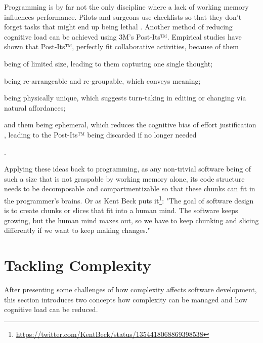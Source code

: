 Programming is by far not the only discipline where a lack of working memory influences performance.
Pilots and surgeons use checklists so that they don't forget tasks that might end up being lethal \cite{seemann_code_2021}.
Another method of reducing cognitive load can be achieved using 3M's Post-Its™.
Empirical studies \cite{digiano_learning_nodate, dove_grouping_2018} have shown that Post-Its™, perfectly fit collaborative activities, because of them
\begin{enumerate*}[label=(\roman*)]
\item being of limited size, leading to them capturing one single thought;
\item being re-arrangeable and re-groupable, which conveys meaning;
\item being physically unique, which suggests turn-taking in editing or changing via natural affordances;
\item and them being ephemeral, which reduces the cognitive bias of effort justification \cite{norton_ikea_2012}, leading to the Post-Its™ being discarded if no longer needed
\end{enumerate*}.

Applying these ideas back to programming, as any non-trivial software being of such a size that is not graspable by working memory alone, its code structure needs to be decomposable and compartmentizable so that these chunks can fit in the programmer's brains.
Or as Kent Beck puts it\footnote{\url{https://twitter.com/KentBeck/status/1354418068869398538}}: "The goal of software design is to create chunks or slices that fit into a human mind. The software keeps growing, but the human mind maxes out, so we have to keep chunking and slicing differently if we want to keep making changes."



\section{Tackling Complexity}
\label{sec:tackling-complexity}
After presenting some challenges of how complexity affects software development, this section introduces two concepts how complexity can be managed and how cognitive load can be reduced.


